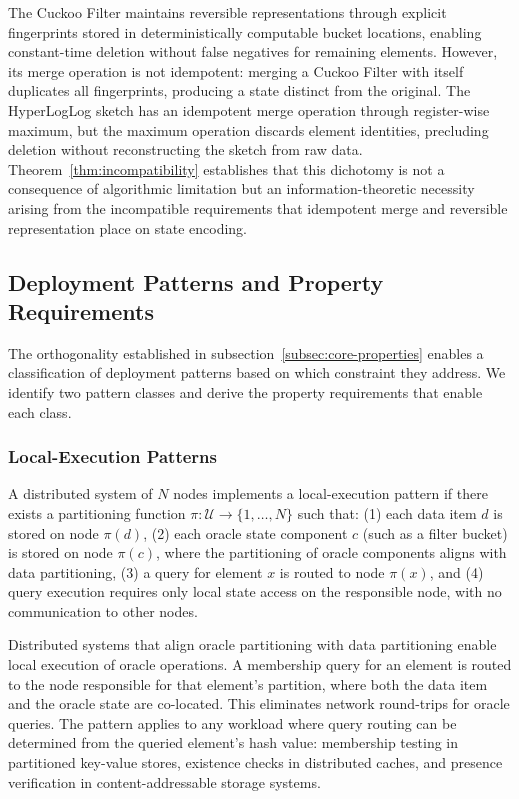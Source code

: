The Cuckoo Filter maintains reversible representations through explicit fingerprints stored in deterministically computable bucket locations, enabling constant-time deletion without false negatives for remaining elements. However, its merge operation is not idempotent: merging a Cuckoo Filter with itself duplicates all fingerprints, producing a state distinct from the original. The HyperLogLog sketch has an idempotent merge operation through register-wise maximum, but the maximum operation discards element identities, precluding deletion without reconstructing the sketch from raw data. Theorem~\ref{thm:incompatibility} establishes that this dichotomy is not a consequence of algorithmic limitation but an information-theoretic necessity arising from the incompatible requirements that idempotent merge and reversible representation place on state encoding.

\subsection{Deployment Patterns and Property Requirements}
\label{subsec:patterns-from-properties}

The orthogonality established in subsection~\ref{subsec:core-properties} enables a classification of deployment patterns based on which constraint they address. We identify two pattern classes and derive the property requirements that enable each class.

\subsubsection{Local-Execution Patterns}
\label{subsubsec:mutability-copartition}

\begin{definition}
    A distributed system of $N$ nodes implements a local-execution pattern if there exists a partitioning function $\pi: \mathcal{U} \to \{1, \ldots, N\}$ such that: (1) each data item $d$ is stored on node $\pi(d)$, (2) each oracle state component $c$ (such as a filter bucket) is stored on node $\pi(c)$, where the partitioning of oracle components aligns with data partitioning, (3) a query for element $x$ is routed to node $\pi(x)$, and (4) query execution requires only local state access on the responsible node, with no communication to other nodes.
\end{definition}

Distributed systems that align oracle partitioning with data partitioning enable local execution of oracle operations. A membership query for an element is routed to the node responsible for that element's partition, where both the data item and the oracle state are co-located. This eliminates network round-trips for oracle queries. The pattern applies to any workload where query routing can be determined from the queried element's hash value: membership testing in partitioned key-value stores, existence checks in distributed caches, and presence verification in content-addressable storage systems.

